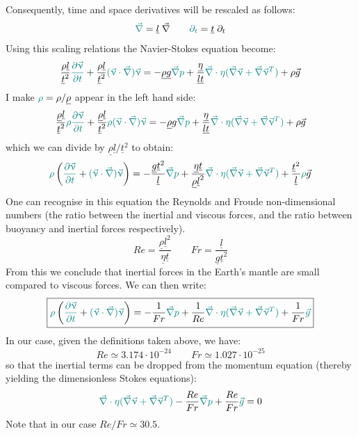 Consequently, time and space derivatives will be rescaled as follows:
\[
{\color{teal} \vec\nabla} = \underline{l}\; \vec\nabla
\qquad
{\color{teal} \partial_t} = \underline{t}\; \partial_t 
\]
Using this scaling relations the Navier-Stokes equation become:
\[
\frac{\rho \underline{l}}{\underline{t}^2} {\color{teal} \frac{\partial \vec\upnu}{\partial t}}
+
\frac{\rho \underline{l}}{\underline{t}^2} {\color{teal} (\vec\upnu \cdot\vec\nabla) \vec\upnu} 
=
- \underline{\rho} \underline{g} {\color{teal} \vec\nabla p}
+
\frac{\underline{\eta}}{\underline{l}\underline{t}} 
{\color{teal} \vec\nabla \cdot \eta (\vec\nabla \vec \upnu + \vec\nabla \vec \upnu ^T)}
+ \rho \vec{g}
\]
I make ${\color{teal}\rho}= \rho/\underline{\rho}$ appear in the left hand side:
\[
\frac{\underline{\rho} \underline{l}}{\underline{t}^2}
{\color{teal}\rho}
 {\color{teal} \frac{\partial \vec\upnu}{\partial t}}
+
\frac{\underline{\rho} \underline{l}}{\underline{t}^2} 
{\color{teal}\rho}
{\color{teal} (\vec\upnu \cdot\vec\nabla) \vec\upnu} 
=
- \underline{\rho} g {\color{teal} \vec\nabla p}
+
\frac{\underline{\eta}}{\underline{l}\underline{t}} 
{\color{teal} \vec\nabla \cdot \eta (\vec\nabla \vec \upnu + \vec\nabla \vec \upnu ^T)}
+ \rho \vec{g}
\]
which we can divide by $\underline{\rho} \underline{l}/\underline{t}^2$ to obtain:
\[
 {\color{teal}\rho} \left(
{\color{teal} \frac{\partial \vec\upnu}{\partial t}}
+
{\color{teal} (\vec\upnu \cdot\vec\nabla) \vec\upnu} 
\right)
=
- \frac{ \underline{g} \underline{t}^2 }{\underline{l}} {\color{teal} \vec\nabla p}
+
\frac{\underline{\eta} \underline{t}}{\underline{\rho} \underline{l}^2 } 
{\color{teal} \vec\nabla \cdot \eta (\vec\nabla \vec \upnu + \vec\nabla \vec \upnu ^T)}
+ \frac{\underline{t}^2}{ \underline{l}}  {\color{teal} \rho} \vec{g}
\]
One can recognise in this equation the Reynolds and Froude 
non-dimensional numbers (the ratio between the inertial and viscous forces, and the 
ratio between buoyancy and inertial forces respectively). 
\[
Re = \frac{\underline{\rho} \underline{l}^2}{\underline{\eta} \underline{t} }
\qquad
Fr= \frac{\underline{l}}{\underline{g}\underline{t}^2 }
\]
From this we conclude that inertial forces in the Earth’s mantle
are small compared to viscous forces.
We can then write:
\[
\boxed{
{\color{teal}\rho} \left(
{\color{teal} \frac{\partial \vec\upnu}{\partial t}}
+
{\color{teal} (\vec\upnu \cdot\vec\nabla) \vec\upnu}  \right)
=
- \frac{1}{Fr} {\color{teal} \vec\nabla p}
+
\frac{1}{Re}
{\color{teal} \vec\nabla \cdot \eta (\vec\nabla \vec \upnu + \vec\nabla \vec \upnu ^T)}
+ \frac{1}{Fr} {\color{teal} \vec{g}}
}
\]
In our case, given the definitions taken above, we have:
\[
Re \simeq 3.174 \cdot 10^{-24}
\qquad
Fr \simeq 1.027 \cdot 10^{-25}
\]
so that the inertial terms can be dropped from the momentum equation (thereby yielding the 
dimensionless Stokes equations):
\[
{\color{teal} \vec\nabla \cdot \eta (\vec\nabla \vec \upnu + \vec\nabla \vec \upnu ^T)}
- \frac{Re}{Fr} {\color{teal} \vec\nabla p}
+ \frac{Re}{Fr}  {\color{teal} \vec{g} }
=0
\]
Note that in our case $Re/Fr\simeq 30.5$. 

